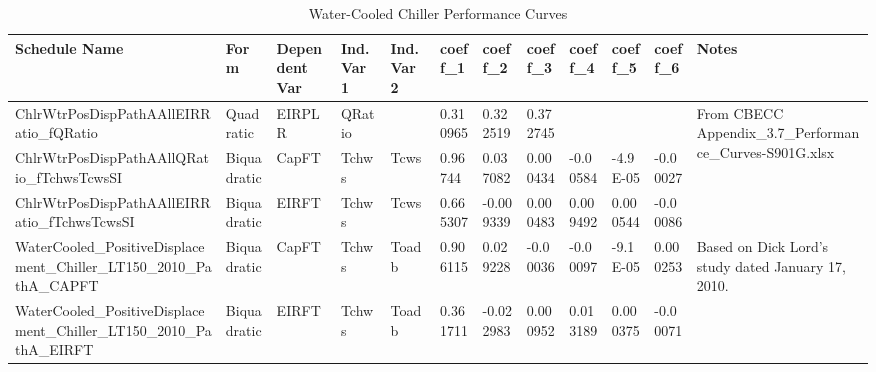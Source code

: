 \begin{table}
\scriptsize
\centering
\caption{Water-Cooled Chiller Performance Curves}
\label{tab:wcc_perf_curves}
\begin{tabular}{|p{0.5in}|p{0.4in}|p{0.4in}|p{0.3in}|p{0.35in}|p{0.35in}|p{0.4in}|p{0.35in}|p{0.35in}|p{0.35in}|p{0.35in}|p{0.4in}|}
\hline
\textbf{Schedule Name} &
  \textbf{Form} &
  \textbf{Dependent   Var} &
  \textbf{Ind. Var 1} &
  \textbf{Ind. Var 2} &
  \textbf{coeff\_1} &
  \textbf{coeff\_2} &
  \textbf{coeff\_3} &
  \textbf{coeff\_4} &
  \textbf{coeff\_5} &
  \textbf{coeff\_6} &
  \textbf{Notes} \\ \hline
ChlrWtr\-PosDisp\-PathA\-All\-EIRRatio\_fQRatio &
  Quadratic &
  EIRPLR &
  QRatio &
   &
  0.310965 &
  0.322519 &
  0.372745 &
   &
   &
   &
  \multirow{3}{*}{\parbox{0.4in}{From CBECC Appendix\_3.7\_Performance\_Curves-S901G.xlsx}} \\ \cline{1-11}
ChlrWtr\-PosDisp\-PathA\-All\-QRatio\_fTchwsTcwsSI &
  Biquadratic &
  CapFT &
  Tchws &
  Tcws &
  0.96744 &
  0.037082 &
  0.000434 &
  -0.00584 &
  -4.9E-05 &
  -0.00027 &
   \\ \cline{1-11}
ChlrWtr\-PosDisp\-PathA\-All\-EIRRatio\_fTchwsTcwsSI &
  Biquadratic &
  EIRFT &
  Tchws &
  Tcws &
  0.665307 &
  -0.009339 &
  0.000483 &
  0.009492 &
  0.000544 &
  -0.00086 &
   \\ \hline
WaterCooled\_PositiveDisplacement\_Chiller\_LT150\_2010\_PathA\_CAPFT &
  Biquadratic &
  CapFT &
  Tchws &
  Toadb &
  0.906115 &
  0.029228 &
  -0.00036 &
  -0.00097 &
  -9.1E-05 &
  0.000253 &
  \multirow{2}{*}{\parbox{0.5in}{Based on Dick Lord's study dated January 17, 2010.}} \\ \cline{1-11}
WaterCooled\_PositiveDisplacement\_Chiller\_LT150\_2010\_PathA\_EIRFT &
  Biquadratic &
  EIRFT &
  Tchws &
  Toadb &
  0.361711 &
  -0.022983 &
  0.000952 &
  0.013189 &
  0.000375 &
  -0.00071 &
   \\ \hline
\end{tabular}
\end{table}